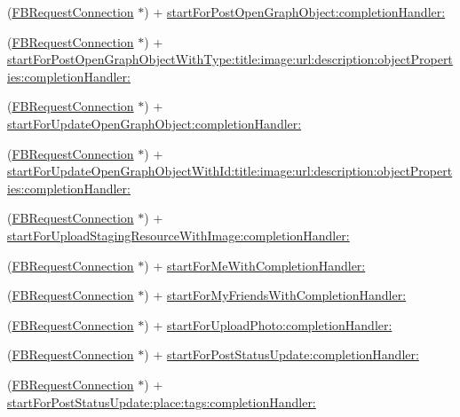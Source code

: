 \begin{DoxyCompactItemize}
\item 
(\hyperlink{interfaceFBRequestConnection}{F\+B\+Request\+Connection} $\ast$) + \hyperlink{interfaceFBRequestConnection_aa592bef80bf5a2450be91fc9538b65bd}{start\+For\+Post\+Open\+Graph\+Object\+:completion\+Handler\+:}
\item 
(\hyperlink{interfaceFBRequestConnection}{F\+B\+Request\+Connection} $\ast$) + \hyperlink{interfaceFBRequestConnection_a98c88d095d77cc16d000fb9ce51d39e1}{start\+For\+Post\+Open\+Graph\+Object\+With\+Type\+:title\+:image\+:url\+:description\+:object\+Properties\+:completion\+Handler\+:}
\item 
(\hyperlink{interfaceFBRequestConnection}{F\+B\+Request\+Connection} $\ast$) + \hyperlink{interfaceFBRequestConnection_a481c4621f12410a7f6bbc7a0ccd6890b}{start\+For\+Update\+Open\+Graph\+Object\+:completion\+Handler\+:}
\item 
(\hyperlink{interfaceFBRequestConnection}{F\+B\+Request\+Connection} $\ast$) + \hyperlink{interfaceFBRequestConnection_ab5cf9ca8b5ab176a3d46fdf8db08ddf8}{start\+For\+Update\+Open\+Graph\+Object\+With\+Id\+:title\+:image\+:url\+:description\+:object\+Properties\+:completion\+Handler\+:}
\item 
(\hyperlink{interfaceFBRequestConnection}{F\+B\+Request\+Connection} $\ast$) + \hyperlink{interfaceFBRequestConnection_a930bc2fc6bfff73c3d98d15e6c84a5f9}{start\+For\+Upload\+Staging\+Resource\+With\+Image\+:completion\+Handler\+:}
\item 
(\hyperlink{interfaceFBRequestConnection}{F\+B\+Request\+Connection} $\ast$) + \hyperlink{interfaceFBRequestConnection_a9d89090f947eacfdf441172f842f5bc8}{start\+For\+Me\+With\+Completion\+Handler\+:}
\item 
(\hyperlink{interfaceFBRequestConnection}{F\+B\+Request\+Connection} $\ast$) + \hyperlink{interfaceFBRequestConnection_a1eeb9942474312db3197be0fa569bc60}{start\+For\+My\+Friends\+With\+Completion\+Handler\+:}
\item 
(\hyperlink{interfaceFBRequestConnection}{F\+B\+Request\+Connection} $\ast$) + \hyperlink{interfaceFBRequestConnection_a824e16e083537312be6d59c8bece3f0e}{start\+For\+Upload\+Photo\+:completion\+Handler\+:}
\item 
(\hyperlink{interfaceFBRequestConnection}{F\+B\+Request\+Connection} $\ast$) + \hyperlink{interfaceFBRequestConnection_a0dee12879e90db0c29e15916375c73b0}{start\+For\+Post\+Status\+Update\+:completion\+Handler\+:}
\item 
(\hyperlink{interfaceFBRequestConnection}{F\+B\+Request\+Connection} $\ast$) + \hyperlink{interfaceFBRequestConnection_a98c2c8abc0efadda28f1c21ec0878a05}{start\+For\+Post\+Status\+Update\+:place\+:tags\+:completion\+Handler\+:}

\end{DoxyCompactItemize}
